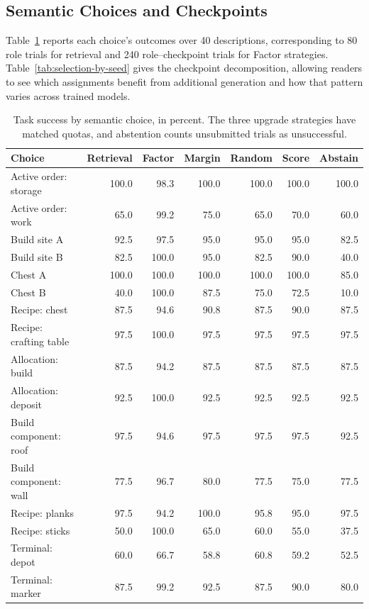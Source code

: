 \documentclass[sigconf,nonacm,balance=false]{aamas}
\newcommand{\tabstyle}{\small\setlength{\tabcolsep}{3pt}\renewcommand{\arraystretch}{1.10}}
\begin{document}
\subsection{Semantic Choices and Checkpoints}
Table~\ref{tab:selection-by-choice} reports each choice's outcomes over 40 descriptions, corresponding to 80 role trials for retrieval and 240 role--checkpoint trials for Factor strategies. Table~\ref{tab:selection-by-seed} gives the checkpoint decomposition, allowing readers to see which assignments benefit from additional generation and how that pattern varies across trained models.
\begin{table}[!htbp]
\centering\tabstyle
\caption{Task success by semantic choice, in percent. The three upgrade strategies have matched quotas, and abstention counts unsubmitted trials as unsuccessful.}
\label{tab:selection-by-choice}
\begin{tabular}{@{}lrrrrrr@{}}
\toprule
\textbf{Choice} & \textbf{Retrieval} & \textbf{Factor} & \textbf{Margin} & \textbf{Random} & \textbf{Score} & \textbf{Abstain}\\
\midrule
Active order: storage & 100.0 & 98.3 & 100.0 & 100.0 & 100.0 & 100.0\\
Active order: work & 65.0 & 99.2 & 75.0 & 65.0 & 70.0 & 60.0\\
Build site A & 92.5 & 97.5 & 95.0 & 95.0 & 95.0 & 82.5\\
Build site B & 82.5 & 100.0 & 95.0 & 82.5 & 90.0 & 40.0\\
Chest A & 100.0 & 100.0 & 100.0 & 100.0 & 100.0 & 85.0\\
Chest B & 40.0 & 100.0 & 87.5 & 75.0 & 72.5 & 10.0\\
Recipe: chest & 87.5 & 94.6 & 90.8 & 87.5 & 90.0 & 87.5\\
Recipe: crafting table & 97.5 & 100.0 & 97.5 & 97.5 & 97.5 & 97.5\\
Allocation: build & 87.5 & 94.2 & 87.5 & 87.5 & 87.5 & 87.5\\
Allocation: deposit & 92.5 & 100.0 & 92.5 & 92.5 & 92.5 & 92.5\\
Build component: roof & 97.5 & 94.6 & 97.5 & 97.5 & 97.5 & 92.5\\
Build component: wall & 77.5 & 96.7 & 80.0 & 77.5 & 75.0 & 77.5\\
Recipe: planks & 97.5 & 94.2 & 100.0 & 95.8 & 95.0 & 97.5\\
Recipe: sticks & 50.0 & 100.0 & 65.0 & 60.0 & 55.0 & 37.5\\
Terminal: depot & 60.0 & 66.7 & 58.8 & 60.8 & 59.2 & 52.5\\
Terminal: marker & 87.5 & 99.2 & 92.5 & 87.5 & 90.0 & 80.0\\
\bottomrule
\end{tabular}
\end{table}
\end{document}
